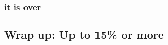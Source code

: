 \documentclass[11pt]{article}
\begin{document}

\subsubsection{it is over}

\subsection{Wrap up: Up to 15\% or more}


\end{document}
